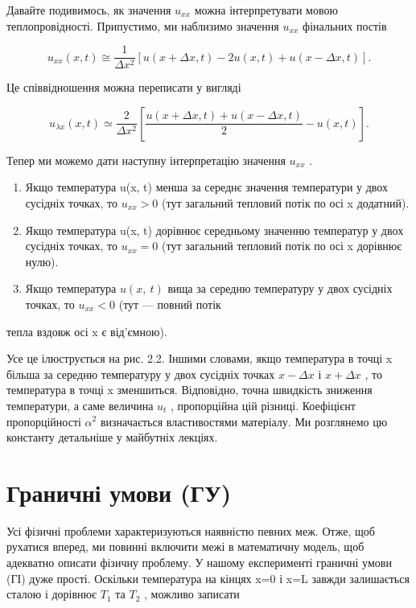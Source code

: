 \documentclass[
  ukrainian,
]{article}
\begin{document}
Давайте подивимось, як значення \(u_{xx}\) можна інтерпретувати мовою
теплопровідності. Припустимо, ми наблизимо значення \(u_{xx}\) фінальних
постів

\[u_{xx}(x, t) \cong \frac{1}{\Delta x^2} [u(x + \Delta x, t) - 2u(x, t) + u(x - \Delta x, t)].\]

Це співвідношення можна переписати у вигляді

\[u_{\lambda x}(x, t) \simeq \frac{2}{\Delta x^2} \left[ \frac{u(x + \Delta x, t) + u(x - \Delta x, t)}{2} - u(x, t) \right].\]

Тепер ми можемо дати наступну інтерпретацію значення \(u_{xx}\) .

\begin{enumerate}
\def\labelenumi{\arabic{enumi}.}
\item
  Якщо температура u(x, t) менша за середнє значення температури у двох
  сусідніх точках, то \(u_{xx} > 0\) (тут загальний тепловий потік по
  осі x додатний).
\item
  Якщо температура u(x, t) дорівнює середньому значенню температур у
  двох сусідніх точках, то \(u_{xx} = 0\) (тут загальний тепловий потік
  по осі x дорівнює нулю).
\item
  Якщо температура \(u\left(x,\ t\right)\) вища за середню температуру у
  двох сусідніх точках, то \(u_{xx}<0\) (тут --- повний потік
\end{enumerate}

тепла вздовж осі x є від'ємною).

Усе це ілюструється на рис. 2.2. Іншими словами, якщо температура в
точці x більша за середню температуру у двох сусідніх точках
\(x - \Delta x\) і \(x + \Delta x\) , то температура в точці x
зменшиться. Відповідно, точна швидкість зниження температури, а саме
величина \(u_t\) , пропорційна цій різниці. Коефіцієнт пропорційності
\(\alpha^2\) визначається властивостями матеріалу. Ми розглянемо цю
константу детальніше у майбутніх лекціях.

\section{Граничні умови
(ГУ)}\label{ux433ux440ux430ux43dux438ux447ux43dux456-ux443ux43cux43eux432ux438-ux433ux443}

Усі фізичні проблеми характеризуються наявністю певних меж. Отже, щоб
рухатися вперед, ми повинні включити межі в математичну модель, щоб
адекватно описати фізичну проблему. У нашому експерименті граничні умови
(ГІ) дуже прості. Оскільки температура на кінцях x=0 і x=L завжди
залишається сталою і дорівнює \(T_1\) та \(T_2\) , можливо записати
\end{document}
